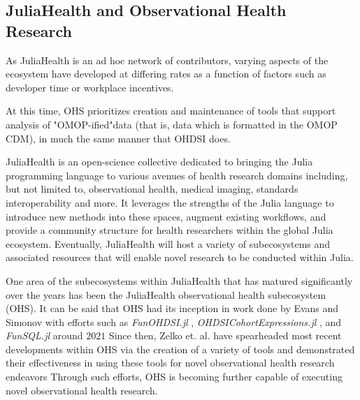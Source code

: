 \documentclass{juliacon}
\begin{document}
\subsection{JuliaHealth and Observational Health Research}

As JuliaHealth is an ad hoc network of contributors, varying aspects of the ecosystem have developed at differing rates as a function of factors such as developer time or workplace incentives.

At this time, OHS prioritizes creation and maintenance of tools that support analysis of "OMOP-ified"\footnotemark data (that is, data which is formatted in the OMOP CDM), in much the same manner that OHDSI does.


JuliaHealth is an open-science collective dedicated to bringing the Julia programming language to various avenues of health research domains including, but not limited to, observational health, medical imaging, standards interoperability and more.\cite{aluthgeAnnouncingJuliaHealthOrganization2020}
It leverages the strengths of the Julia language to introduce new methods into these spaces, augment existing workflows, and provide a community structure for health researchers within the global Julia ecosystem.
Eventually, JuliaHealth will host a variety of subecosystems and associated resources that will enable novel research to be conducted within Julia. 

One area of the subecosystems within JuliaHealth that has matured significantly over the years has been the JuliaHealth observational health subecosystem (OHS).
It can be said that OHS had its inception in work done by Evans and Simonov with efforts such as \textit{FunOHDSI.jl} \cite{evansFunOHDSIJl2022}, \textit{OHDSICohortExpressions.jl} \cite{evansOHDSICohortExpressionsJl2023}, and \textit{FunSQL.jl} around $2021$ \cite{kirill_simonov_2023_7705325}
Since then, Zelko et. al. have spearheaded most recent developments within OHS via the creation of a variety of tools and demonstrated their effectiveness in using these tools for novel observational health research endeavors \cite{zelko2022pilot}
Through such efforts, OHS is becoming further capable of executing novel observational health research. 
\end{document}
